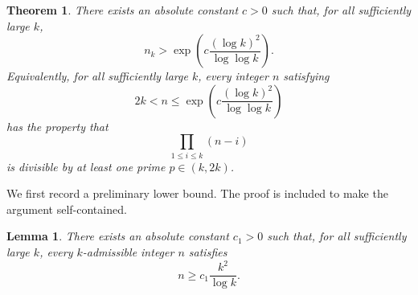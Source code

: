 \documentclass[11pt]{article}
\newtheorem{theorem}{Theorem}
\newtheorem{lemma}{Lemma}
\begin{document}
\begin{theorem}
\label{thm:main}
There exists an absolute constant \(c>0\) such that, for all sufficiently large
\(k\),
\[
        n_k>
        \exp\!\left(
        c\frac{(\log k)^2}{\log\log k}
        \right).
\]
Equivalently, for all sufficiently large \(k\), every integer \(n\) satisfying
\[
        2k<n\le
        \exp\!\left(
        c\frac{(\log k)^2}{\log\log k}
        \right)
\]
has the property that
\[
        \prod_{1\le i\le k}(n-i)
\]
is divisible by at least one prime \(p\in(k,2k)\).
\end{theorem}

We first record a preliminary lower bound. The proof is included to make the
argument self-contained.

\begin{lemma}
\label{lem:prelim}
There exists an absolute constant \(c_1>0\) such that, for all sufficiently
large \(k\), every \(k\)-admissible integer \(n\) satisfies
\[
        n\ge c_1\frac{k^2}{\log k}.
\]
\end{lemma}
\end{document}
